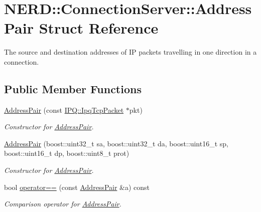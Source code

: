 \hypertarget{structNERD_1_1ConnectionServer_1_1AddressPair}{
\section{\-N\-E\-R\-D\-:\-:\-Connection\-Server\-:\-:\-Address\-Pair \-Struct \-Reference}
\label{structNERD_1_1ConnectionServer_1_1AddressPair}
}


\-The source and destination addresses of \-I\-P packets travelling in one direction in a connection.  


\subsection*{\-Public \-Member \-Functions}
\begin{DoxyCompactItemize}
\item 
\hyperlink{structNERD_1_1ConnectionServer_1_1AddressPair_a754684b80d70b7ec666a23cfcfce1362}{\-Address\-Pair} (const \hyperlink{classIPQ_1_1IpqTcpPacket}{\-I\-P\-Q\-::\-Ipq\-Tcp\-Packet} $\ast$pkt)
\begin{DoxyCompactList}\small\item\em \-Constructor for \hyperlink{structNERD_1_1ConnectionServer_1_1AddressPair}{\-Address\-Pair}. \end{DoxyCompactList}\item 
\hyperlink{structNERD_1_1ConnectionServer_1_1AddressPair_ab6660cb88d8c3e0599010b533055f1ae}{\-Address\-Pair} (boost\-::uint32\-\_\-t sa, boost\-::uint32\-\_\-t da, boost\-::uint16\-\_\-t sp, boost\-::uint16\-\_\-t dp, boost\-::uint8\-\_\-t prot)
\begin{DoxyCompactList}\small\item\em \-Constructor for \hyperlink{structNERD_1_1ConnectionServer_1_1AddressPair}{\-Address\-Pair}. \end{DoxyCompactList}\item 
bool \hyperlink{structNERD_1_1ConnectionServer_1_1AddressPair_a39646b4ae1a85e00388f8282b50945b7}{operator==} (const \hyperlink{structNERD_1_1ConnectionServer_1_1AddressPair}{\-Address\-Pair} \&a) const 
\begin{DoxyCompactList}\small\item\em \-Comparison operator for \hyperlink{structNERD_1_1ConnectionServer_1_1AddressPair}{\-Address\-Pair}. \end{DoxyCompactList}\end{DoxyCompactItemize}
